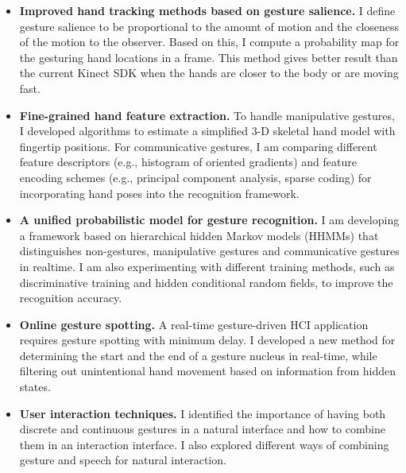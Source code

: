 \begin{itemize}
  \item \textbf{Improved hand tracking methods based on gesture salience.}
  I define gesture salience to be proportional to the amount of motion and the
  closeness of the motion to the observer. Based on this, I compute a
  probability map for the gesturing hand locations in a frame. This method
  gives better result than the current Kinect SDK when the hands are closer to
  the body or are moving fast.

  \item \textbf{Fine-grained hand feature extraction.} To handle manipulative
  gestures, I developed algorithms to estimate a simplified 3-D
  skeletal hand model with fingertip positions. For communicative gestures, I am
  comparing different feature descriptors (e.g., histogram of oriented
  gradients) and feature encoding schemes (e.g., principal component analysis,
  sparse coding) for incorporating hand poses into the recognition framework.

  \item \textbf{A unified probabilistic model for gesture recognition.} I am
  developing a framework based on hierarchical hidden Markov
  models (HHMMs) that distinguishes non-gestures, 
  manipulative gestures and communicative gestures in realtime. I am also experimenting with different
  training methods, such as discriminative training and hidden conditional
  random fields, to improve the recognition accuracy. 

  \item \textbf{Online gesture spotting.} A real-time gesture-driven HCI
  application requires gesture spotting with minimum delay. I developed a new
  method for determining the start and the end of a gesture nucleus in
  real-time, while filtering out unintentional hand movement based on
  information from hidden states.
  
  \item \textbf{User interaction techniques.} I identified the importance of
  having both discrete and continuous gestures in a natural interface and how to
  combine them in an interaction interface. I also explored different ways of
  combining gesture and speech for natural interaction.
\end{itemize}

